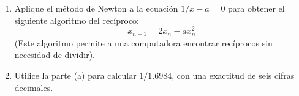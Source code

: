 \item \par
\begin{enumerate}
    \item[(a)] Aplique el método de Newton a la ecuación $1/x - a = 0$ para obtener el siguiente algoritmo del recíproco:
    $$x_{n+1} = 2x_n - a x_n^2$$
    (Este algoritmo permite a una computadora encontrar recíprocos sin necesidad de dividir).
    \item[(b)] Utilice la parte (a) para calcular $1/1.6984$, con una exactitud de seis cifras decimales.
\end{enumerate}
